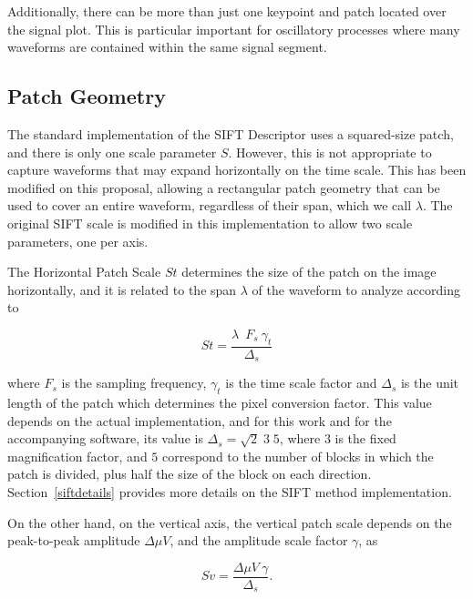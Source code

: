 \documentclass[review]{elsarticle}
\begin{document}
Additionally, there can be more than just one keypoint and patch located over the signal plot.  This is particular important for oscillatory processes where many waveforms are contained within the same signal segment.  

\subsection{Patch Geometry}
\label{patchgeometry}


The standard implementation of the SIFT Descriptor uses a squared-size patch, and there is only one scale parameter $S$.  However, this is not appropriate to capture waveforms that may expand horizontally on the time scale.  This has been modified on this proposal,  allowing a rectangular patch geometry that can be used to cover an entire waveform, regardless of their span, which we call $\lambda$.  The original SIFT scale is modified in this implementation to allow two scale parameters, one per axis.

The Horizontal Patch Scale $St$ determines the size of the patch on the image horizontally, and it is related to the span $\lambda$ of the waveform to analyze according to

\begin{equation}
St = \frac{ \lambda \;  \  F_s \ \gamma_t }{\Delta_s}
\label{eq:horizontalpatchscale}
\end{equation}

\noindent where $F_s$ is the sampling frequency, $\gamma_t$ is the time scale factor and $\Delta_s$ is the unit length of the patch which determines the pixel conversion factor.  This value depends on the actual implementation, and for this work and for the accompanying software, its value is $\Delta_s = \sqrt{2} \; 3 \; 5$, where $3$ is the fixed magnification factor, and $5$ correspond to the number of blocks in which the patch is divided, plus half the size of the block on each direction.  Section~\ref{siftdetails} provides more details on the SIFT method implementation.

On the other hand, on the vertical axis, the vertical patch scale depends on the peak-to-peak amplitude $\Delta \mu V$, and the amplitude scale factor $\gamma$, as

\begin{equation}
Sv = \frac{\Delta \mu V \ \gamma}{\Delta_s}.
\label{eq:verticalpatchscale}
\end{equation}
\end{document}
